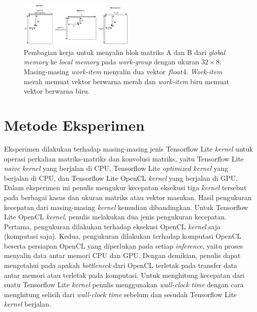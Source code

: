 \begin{figure}
	\centering
	\includegraphics[width=0.50\textwidth]
	{pics/localmatmat.png}
	\caption{Pembagian kerja untuk menyalin blok matriks A dan B dari \textit{global memory} ke \textit{local memory} pada \textit{work-group} dengan ukuran $32 \times 8$. Masing-masing \textit{work-item} menyalin dua vektor $float4$. \textit{Work-item} merah memuat vektor berwarna merah dan \textit{work-item} biru memuat vektor berwarna biru.}
	\label{fig:localmatmat}
\end{figure}

\section{Metode Eksperimen }
Eksperimen dilakukan terhadap masing-masing jenis Tensorflow Lite \textit{kernel} untuk operasi perkalian matriks-matriks dan konvolusi matriks, yaitu Tensorflow Lite \textit{naive kernel} yang berjalan di CPU, Tensorflow Lite \textit{optimized kernel} yang berjalan di CPU, dan Tensorflow Lite OpenCL \textit{kernel} yang berjalan di GPU. Dalam eksperimen ini penulis mengukur kecepatan eksekusi tiga \textit{kernel} tersebut pada berbagai kasus dan ukuran matriks atau vektor masukan. Hasil pengukuran kecepatan dari masing-masing \textit{kernel} kemudian dibandingkan. Untuk Tensorflow Lite OpenCL \textit{kernel}, penulis melakukan dua jenis pengukuran kecepatan. Pertama, pengukuran dilakukan terhadap eksekusi OpenCL \textit{kernel} saja (komputasi saja). Kedua, pengukuran dilakukan terhadap komputasi OpenCL beserta persiapan OpenCL yang diperlukan pada setiap \textit{inference}, yaitu proses menyalin data antar memori CPU dan GPU. Dengan demikian, penulis dapat mengetahui pada apakah \textit{bottleneck} dari OpenCL terletak pada transfer data antar memori atau terletak pada komputasi. Untuk menghitung kecepatan dari suatu Tensorflow Lite \textit{kernel} penulis menggunakan \textit{wall-clock time} dengan cara menghitung selisih dari \textit{wall-clock time} sebelum dan sesudah Tensorflow Lite \textit{kernel} berjalan.
